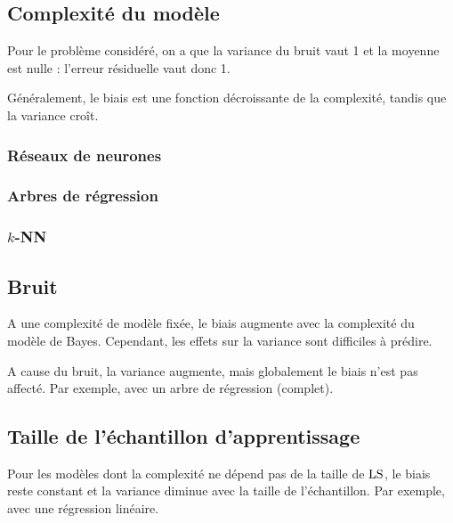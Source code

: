 		\subsection{Complexité du modèle}
		
		Pour le problème considéré, on a que la variance du bruit vaut 1 et la moyenne est nulle : l'erreur résiduelle vaut donc 1.
		
		
		Généralement, le biais est une fonction décroissante de la complexité, tandis que la variance croît.
		
			\subsubsection{Réseaux de neurones}
		
		
			\subsubsection{Arbres de régression}
			
			
			\subsubsection{$k$-NN}
			
		
		\subsection{Bruit}
		
		A une complexité de modèle fixée, le biais augmente avec la complexité du modèle de Bayes. Cependant, les effets sur la variance sont difficiles à prédire.
		
		A cause du bruit, la variance augmente, mais globalement le biais n'est pas affecté. Par exemple, avec un arbre de régression (complet).
		
		
		\subsection{Taille de l'échantillon d'apprentissage}
		
		Pour les modèles dont la complexité ne dépend pas de la taille de $\text{LS}$, le biais reste constant et la variance diminue avec la taille de l'échantillon. Par exemple, avec une régression linéaire.
		
